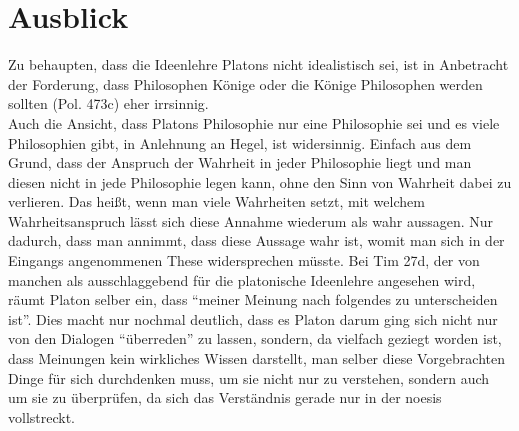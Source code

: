 \documentclass[12pt]{article}
\begin{document}


\section{Ausblick}
Zu behaupten, dass die Ideenlehre Platons nicht idealistisch sei, ist in Anbetracht der Forderung, dass Philosophen Könige oder die Könige Philosophen werden sollten (Pol. 473c) eher irrsinnig.\\
Auch die Ansicht, dass Platons Philosophie nur eine Philosophie sei und es viele Philosophien gibt, in Anlehnung an Hegel, ist widersinnig. Einfach aus dem Grund, dass der Anspruch der Wahrheit in jeder Philosophie liegt und man diesen nicht in jede Philosophie legen kann, ohne den Sinn von Wahrheit dabei zu verlieren. Das heißt, wenn man viele Wahrheiten setzt, mit welchem Wahrheitsanspruch lässt sich diese Annahme wiederum als wahr aussagen. Nur dadurch, dass man annimmt, dass diese Aussage wahr ist, womit man sich in der Eingangs angenommenen These widersprechen müsste.
Bei Tim 27d, der von manchen als ausschlaggebend für die platonische Ideenlehre angesehen wird, räumt Platon selber ein, dass \enquote{meiner Meinung nach folgendes zu unterscheiden ist}. Dies macht nur nochmal deutlich, dass es Platon darum ging sich nicht nur von den Dialogen \enquote{überreden} zu lassen, sondern, da vielfach geziegt worden ist, dass Meinungen kein wirkliches Wissen darstellt, man selber diese Vorgebrachten Dinge für sich durchdenken muss, um sie nicht nur zu verstehen, sondern auch um sie zu überprüfen, da sich das Verständnis gerade nur in der noesis vollstreckt.   
\end{document}
